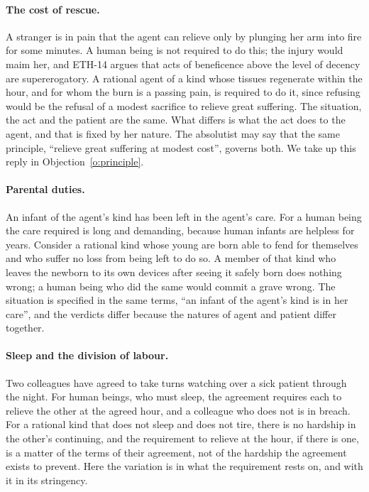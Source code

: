 \documentclass{situationist-preprint}
\begin{document}
\paragraph{The cost of rescue.} A stranger is in pain that the agent can relieve only by plunging her arm into fire for some minutes. A human being is not required to do this; the injury would maim her, and ETH-14 argues that acts of beneficence above the level of decency are supererogatory. A rational agent of a kind whose tissues regenerate within the hour, and for whom the burn is a passing pain, is required to do it, since refusing would be the refusal of a modest sacrifice to relieve great suffering. The situation, the act and the patient are the same. What differs is what the act does to the agent, and that is fixed by her nature. The absolutist may say that the same principle, \enquote{relieve great suffering at modest cost}, governs both. We take up this reply in Objection~\ref{o:principle}.

\paragraph{Parental duties.} An infant of the agent's kind has been left in the agent's care. For a human being the care required is long and demanding, because human infants are helpless for years. Consider a rational kind whose young are born able to fend for themselves and who suffer no loss from being left to do so. A member of that kind who leaves the newborn to its own devices after seeing it safely born does nothing wrong; a human being who did the same would commit a grave wrong. The situation is specified in the same terms, \enquote{an infant of the agent's kind is in her care}, and the verdicts differ because the natures of agent and patient differ together.

\paragraph{Sleep and the division of labour.} Two colleagues have agreed to take turns watching over a sick patient through the night. For human beings, who must sleep, the agreement requires each to relieve the other at the agreed hour, and a colleague who does not is in breach. For a rational kind that does not sleep and does not tire, there is no hardship in the other's continuing, and the requirement to relieve at the hour, if there is one, is a matter of the terms of their agreement, not of the hardship the agreement exists to prevent. Here the variation is in what the requirement rests on, and with it in its stringency.
\end{document}
